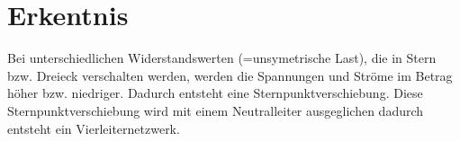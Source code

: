 \documentclass[11pt,a4paper,fleqn]{scrartcl}
\begin{document}
    \section{Erkentnis}

    Bei unterschiedlichen Widerstandswerten (=unsymetrische Last), die in Stern bzw. Dreieck verschalten werden, werden
    die Spannungen und Ströme im Betrag höher bzw. niedriger.
    Dadurch entsteht eine Sternpunktverschiebung. Diese Sternpunktverschiebung wird mit einem Neutralleiter
    ausgeglichen dadurch entsteht ein Vierleiternetzwerk.
\end{document}
